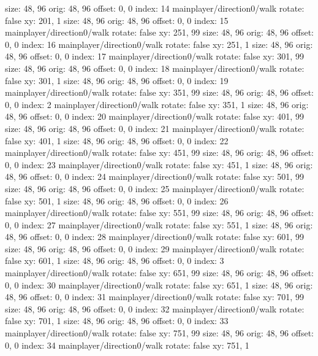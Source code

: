   size: 48, 96
  orig: 48, 96
  offset: 0, 0
  index: 14
mainplayer/direction0/walk
  rotate: false
  xy: 201, 1
  size: 48, 96
  orig: 48, 96
  offset: 0, 0
  index: 15
mainplayer/direction0/walk
  rotate: false
  xy: 251, 99
  size: 48, 96
  orig: 48, 96
  offset: 0, 0
  index: 16
mainplayer/direction0/walk
  rotate: false
  xy: 251, 1
  size: 48, 96
  orig: 48, 96
  offset: 0, 0
  index: 17
mainplayer/direction0/walk
  rotate: false
  xy: 301, 99
  size: 48, 96
  orig: 48, 96
  offset: 0, 0
  index: 18
mainplayer/direction0/walk
  rotate: false
  xy: 301, 1
  size: 48, 96
  orig: 48, 96
  offset: 0, 0
  index: 19
mainplayer/direction0/walk
  rotate: false
  xy: 351, 99
  size: 48, 96
  orig: 48, 96
  offset: 0, 0
  index: 2
mainplayer/direction0/walk
  rotate: false
  xy: 351, 1
  size: 48, 96
  orig: 48, 96
  offset: 0, 0
  index: 20
mainplayer/direction0/walk
  rotate: false
  xy: 401, 99
  size: 48, 96
  orig: 48, 96
  offset: 0, 0
  index: 21
mainplayer/direction0/walk
  rotate: false
  xy: 401, 1
  size: 48, 96
  orig: 48, 96
  offset: 0, 0
  index: 22
mainplayer/direction0/walk
  rotate: false
  xy: 451, 99
  size: 48, 96
  orig: 48, 96
  offset: 0, 0
  index: 23
mainplayer/direction0/walk
  rotate: false
  xy: 451, 1
  size: 48, 96
  orig: 48, 96
  offset: 0, 0
  index: 24
mainplayer/direction0/walk
  rotate: false
  xy: 501, 99
  size: 48, 96
  orig: 48, 96
  offset: 0, 0
  index: 25
mainplayer/direction0/walk
  rotate: false
  xy: 501, 1
  size: 48, 96
  orig: 48, 96
  offset: 0, 0
  index: 26
mainplayer/direction0/walk
  rotate: false
  xy: 551, 99
  size: 48, 96
  orig: 48, 96
  offset: 0, 0
  index: 27
mainplayer/direction0/walk
  rotate: false
  xy: 551, 1
  size: 48, 96
  orig: 48, 96
  offset: 0, 0
  index: 28
mainplayer/direction0/walk
  rotate: false
  xy: 601, 99
  size: 48, 96
  orig: 48, 96
  offset: 0, 0
  index: 29
mainplayer/direction0/walk
  rotate: false
  xy: 601, 1
  size: 48, 96
  orig: 48, 96
  offset: 0, 0
  index: 3
mainplayer/direction0/walk
  rotate: false
  xy: 651, 99
  size: 48, 96
  orig: 48, 96
  offset: 0, 0
  index: 30
mainplayer/direction0/walk
  rotate: false
  xy: 651, 1
  size: 48, 96
  orig: 48, 96
  offset: 0, 0
  index: 31
mainplayer/direction0/walk
  rotate: false
  xy: 701, 99
  size: 48, 96
  orig: 48, 96
  offset: 0, 0
  index: 32
mainplayer/direction0/walk
  rotate: false
  xy: 701, 1
  size: 48, 96
  orig: 48, 96
  offset: 0, 0
  index: 33
mainplayer/direction0/walk
  rotate: false
  xy: 751, 99
  size: 48, 96
  orig: 48, 96
  offset: 0, 0
  index: 34
mainplayer/direction0/walk
  rotate: false
  xy: 751, 1
